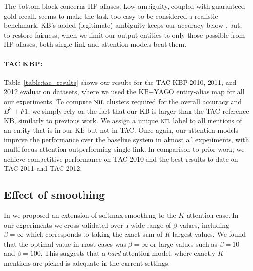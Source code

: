 The bottom block concerns HP aliases.  Low ambiguity, coupled with
guaranteed gold recall, seems to make the task too easy to be
considered a realistic benchmark.  KB's added (legitimate) ambiguity
keeps our accuracy below , but, to restore
fairness, when we limit our output entities to only those possible
from HP aliases, both single-link and attention models beat them.


\paragraph*{TAC KBP:}
Table~\ref{table:tac_results} shows our results for the TAC KBP 2010, 2011, and 2012
evaluation datasets, where we used the KB+YAGO entity-alias map for all our experiments. 
To compute $\mbox{\textsc{nil}}$ clusters required for the overall accuracy
and $B^3+F1$, we simply rely on the fact that our KB is larger than the TAC
reference KB, similarly to previous work. We assign a unique $\mbox{\textsc{nil}}$ label to
all mentions of an entity that is in our KB but not in TAC. 
Once again, our attention models improve the performance over the baseline
system in almost all experiments, with multi-focus attention outperforming single-link. In comparison to
prior work, we achieve competitive performance on TAC 2010 and the best
results to date on TAC 2011 and TAC 2012.





\subsection{Effect of smoothing}
In  we proposed an extension of softmax smoothing to the $K$ attention case. In our experiments 
we cross-validated over a wide range of $\beta$ values, including $\beta=\infty$ which corresponds to taking
the exact sum of $K$ largest values. We found that the optimal value in most cases was  $\beta=\infty$ or large values
such as $\beta=10$ and $\beta=100$. This suggests that a {\em hard} attention model, where exactly $K$ mentions are picked is adequate in the current settings.



